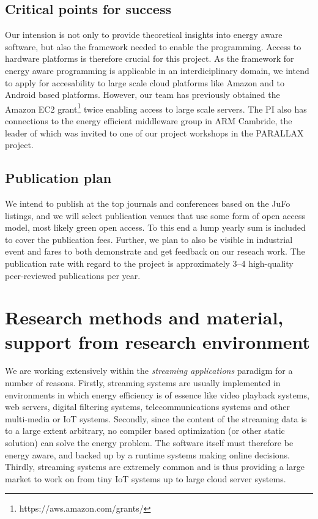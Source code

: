 \documentclass{article}
\begin{document}
\subsection{Critical points for success}
Our intension is not only to provide theoretical insights into energy aware software, but also the framework needed to enable the programming.
Access to hardware platforms is therefore crucial for this project.
As the framework for energy aware programming is applicable in an interdiciplinary domain, we intend to apply for accesability to large scale cloud platforms like Amazon and to Android based platforms.
However, our team has previously obtained the Amazon EC2 grant\footnote{https://aws.amazon.com/grants/} twice enabling access to large scale servers.
The PI also has connections to the energy efficient middleware group in ARM Cambride, the leader of which was invited to one of our project workshops in the PARALLAX project.

\subsection{Publication plan}
We intend to publish at the top journals and conferences based on the JuFo listings, and we will select publication venues that use some form of open access model, most likely green open access. 
To this end a lump yearly sum is included to cover the publication fees. 
Further, we plan to also be visible in industrial event and fares to both demonstrate and get feedback on our reseach work.
The publication rate with regard to the project is approximately 3--4 high-quality peer-reviewed publications per year.

\section{Research methods and material, support from research environment}

We are working extensively within the \textit{streaming applications} paradigm for a number of reasons. 
Firstly, streaming systems are usually implemented in environments in which energy efficiency is of essence like video playback systems, web servers, digital filtering systems, telecommunications systems and other multi-media or IoT systems. 
Secondly, since the content of the streaming data is to a large extent arbitrary, no compiler based optimization (or other static solution) can solve the energy problem. 
The software itself must therefore be energy aware, and backed up by a runtime systems making online decisions. 
Thirdly, streaming systems are extremely common and is thus providing a large market to work on from tiny IoT systems up to large cloud server systems.
\end{document}
